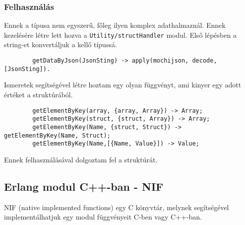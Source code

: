 	\subsubsection{Felhasználás}
	Ennek a típusa nem egyszerű, főleg ilyen komplex adathalmaznál. Ennek kezelésére létre lett hozva a \texttt{Utility/structHandler} modul. \newline 
	Első lépésben a string-et konvertáljuk a kellő típussá. 
	\begin{verbatim}
		getDataByJson(JsonSting) -> apply(mochijson, decode, [JsonSting]).
	\end{verbatim}
	Ismeretek segítségével létre hoztam egy olyan függvényt, ami kinyer egy adott értéket a struktúrából.
	\begin{verbatim}
		getElementByKey(array, {array, Array}) -> Array;
		getElementByKey(struct, {struct, Array}) -> Array;
		getElementByKey(Name, {struct, Struct}) -> getElementByKey(Name, Struct);
		getElementByKey(Name,[{Name, Value}]) -> Value;
	\end{verbatim}
	Ennek felhasználásával dolgoztam fel a struktúrát.

\subsection{\label{subsec:nif} Erlang modul C++-ban - NIF}

	NIF \cite{erl_nif} (native implemented functions) egy C könyvtár, melynek segítségével implementálhatjuk egy modul függvényeit C-ben vagy C++-ban. 
